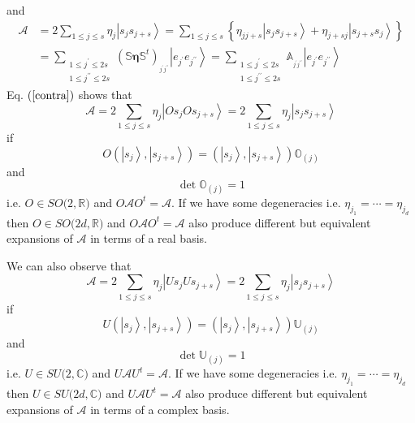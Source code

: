 \documentclass[aps,preprint]{revtex4}%
\begin{document}
and
\begin{align}
\mathcal{A}  & =2\sum_{1\leq j\leq s}\eta_{j}\left\vert s_{j}s_{j+s}%
\right\rangle =\sum_{1\leq j\leq s}\left\{  \eta_{jj+s}\left\vert s_{j}%
s_{j+s}\right\rangle +\eta_{j+sj}\left\vert s_{j+s}s_{j}\right\rangle \right\}
\nonumber\\
& =\sum_{\substack{1\leq j^{\prime}\leq2s \\1\leq j^{\prime\prime}\leq2s
}}\left(  \mathbb{S}\mathbf{\eta}\mathbb{S}^{t}\right)  _{_{j^{\prime
}j^{\prime\prime}}}\left\vert e_{j^{\prime}}e_{j^{\prime\prime}}\right\rangle
=\sum_{\substack{1\leq j^{\prime}\leq2s \\1\leq j^{\prime\prime}\leq2s
}}\mathbb{A}_{_{j^{\prime}j^{\prime\prime}}}\left\vert e_{j^{\prime}%
}e_{j^{\prime\prime}}\right\rangle
\end{align}
Eq. $\left(  \ref{contra}\right)  $ shows that
\begin{equation}
\mathcal{A}=2\sum_{1\leq j\leq s}\eta_{j}\left\vert Os_{j}Os_{j+s}%
\right\rangle =2\sum_{1\leq j\leq s}\eta_{j}\left\vert s_{j}s_{j+s}%
\right\rangle
\end{equation}
if
\begin{equation}
O\left(  \left\vert s_{j}\right\rangle ,\left\vert s_{j+s}\right\rangle
\right)  =\left(  \left\vert s_{j}\right\rangle ,\left\vert s_{j+s}%
\right\rangle \right)  \mathbb{O}_{\left(  j\right)  }%
\end{equation}
and
\begin{equation}
\det\mathbb{O}_{\left(  j\right)  }=1
\end{equation}
i.e. $O\in SO(2,\mathbb{R)}$ and $O\mathcal{A}O^{t}=\mathcal{A}.$ If we have
some degeneracies i.e. $\eta_{j_{1}}=\cdots=\eta_{j_{d}}$ then $O\in
SO(2d,\mathbb{R)}$ and $O\mathcal{A}O^{t}=\mathcal{A}$ also produce different
but equivalent expansions of $\mathcal{A}$ in terms of a real basis.

We can also observe that
\begin{equation}
\mathcal{A}=2\sum_{1\leq j\leq s}\eta_{j}\left\vert Us_{j}Us_{j+s}%
\right\rangle =2\sum_{1\leq j\leq s}\eta_{j}\left\vert s_{j}s_{j+s}%
\right\rangle
\end{equation}
if
\begin{equation}
U\left(  \left\vert s_{j}\right\rangle ,\left\vert s_{j+s}\right\rangle
\right)  =\left(  \left\vert s_{j}\right\rangle ,\left\vert s_{j+s}%
\right\rangle \right)  \mathbb{U}_{\left(  j\right)  }%
\end{equation}
and
\begin{equation}
\det\mathbb{U}_{\left(  j\right)  }=1
\end{equation}
i.e. $U\in SU(2,\mathbb{C)}$ and $U\mathcal{A}U^{t}=\mathcal{A}.$ If we have
some degeneracies i.e. $\eta_{j_{1}}=\cdots=\eta_{j_{d}}$ then $U\in
SU(2d,\mathbb{C)}$ and $U\mathcal{A}U^{t}=\mathcal{A}$ also produce different
but equivalent expansions of $\mathcal{A}$ in terms of a complex basis.
\end{document}
